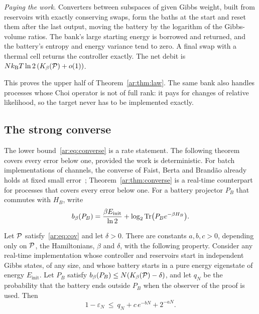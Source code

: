 \emph{Paying the work.} Converters between subspaces of given Gibbs weight, built from reservoirs with exactly conserving swaps, form the baths at the start and reset them after the last output, moving the battery by the logarithm of the Gibbs-volume ratios. The bank's large starting energy is borrowed and returned, and the battery's entropy and energy variance tend to zero. A final swap with a thermal cell returns the controller exactly. The net debit is $Nk_{\mathrm B} T\ln2\,(K_\beta(\mathcal P)+o(1))$.

This proves the upper half of Theorem~\ref{ar:thm:law}. The same bank also handles processes whose Choi operator is not of full rank: it pays for changes of relative likelihood, so the target never has to be implemented exactly.

\subsection{The strong converse}\label{ar:sec:converse}

The lower bound~\eqref{ar:eq:converse} is a rate statement. The following theorem covers every error below one, provided the work is deterministic. For batch implementations of channels, the converse of Faist, Berta and Brand\~ao already holds at fixed small error~\cite[Prop.~4.2]{FBB21}; Theorem~\ref{ar:thm:converse} is a real-time counterpart for processes that covers every error below one. For a battery projector $P_B$ that commutes with $H_B$, write
\[
b_\beta(P_B)=\frac{\beta E_{\mathrm{init}}}{\ln2}+\log_2\operatorname{Tr}\bigl(P_Be^{-\beta H_B}\bigr).
\]

\begin{theorem}\label{ar:thm:converse}
Let $\mathcal P$ satisfy~\eqref{ar:eq:cov} and let $\delta>0$. There are constants $a,b,c>0$, depending only on $\mathcal P$, the Hamiltonians, $\beta$ and $\delta$, with the following property. Consider any real-time implementation whose controller and reservoirs start in independent Gibbs states, of any size, and whose battery starts in a pure energy eigenstate of energy $E_{\mathrm{init}}$. Let $P_B$ satisfy $b_\beta(P_B)\le N(K_\beta(\mathcal P)-\delta)$, and let $q_N$ be the probability that the battery ends outside $P_B$ when the observer of the proof is used. Then
\[
1-\varepsilon_N\ \le\ q_N+c\,e^{-bN}+2^{-aN}.
\]
\end{theorem}

